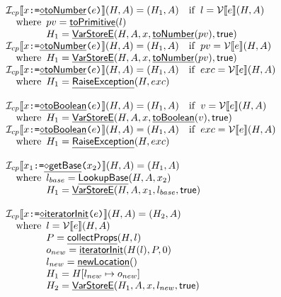 \[
\begin{array}{ll}

\I _{cp}\lbr x \TT{:=} \chfi{toNumber}\TT{(}e\TT{)} \rbr(H,A)
= (H_1, A)\quad\ifc{l = \V\lbr e\rbr(H,A)}
\\\quad\wherec{
  pv=\chf{toPrimitive}(l)\\
  H_1=\chf{VarStoreE}(H,A,x,\chf{toNumber}(pv),\vtrue)
}\\
\I _{cp}\lbr x \TT{:=} \chfi{toNumber}\TT{(}e\TT{)} \rbr(H,A)
= (H_1, A)\quad\ifc{pv = \V\lbr e\rbr(H,A)}
\\\quad\wherec{
  H_1=\chf{VarStoreE}(H,A,x,\chf{toNumber}(pv),\vtrue)
}\\
\I _{cp}\lbr x \TT{:=} \chfi{toNumber}\TT{(}e\TT{)} \rbr(H,A)
 = (H_1, A)\quad\ifc{exc = \V\lbr e\rbr(H,A)} \\
\quad\wherec{
  H_1=\chf{RaiseException}(H,exc)
}
\\\\

\I _{cp}\lbr x \TT{:=} \chfi{toBoolean}\TT{(}e\TT{)} \rbr(H,A)
= (H_1, A)\quad\ifc{v = \V\lbr e\rbr(H,A)}
\\\quad\wherec{
  H_1=\chf{VarStoreE}(H,A,x,\chf{toBoolean}(v),\vtrue)
}\\
\I _{cp}\lbr x \TT{:=} \chfi{toBoolean}\TT{(}e\TT{)} \rbr(H,A)
 = (H_1, A)\quad\ifc{exc = \V\lbr e\rbr(H,A)} \\
\quad\wherec{
  H_1=\chf{RaiseException}(H,exc)
}
\\\\

\I _{cp}\lbr x_1 \TT{:=} \chfi{getBase}\TT{(}x_2\TT{)} \rbr(H,A)
 = (H_1,A) \\
\quad\wherec{
  l_{base}=\chf{LookupBase}(H,A,x_2)\\
  H_1=\chf{VarStoreE}(H,A,x_1,l_{base},\vtrue)
}
\\\\

\I _{cp}\lbr x \TT{:=} \chfi{iteratorInit}\TT{(}e\TT{)} \rbr(H,A)
 = (H_2,A) \\
  \quad\wherec{
  l = \V\lbr e\rbr(H,A) \\
  P = \chf{collectProps}(H,l) \\
  o_{new} = \chf{iteratorInit}(H(l), P, 0) \\
  l_{new} = \chf{newLocation}() \\
  H_1 = H[l_{new}\mapsto o_{new}] \\
  H_2 = \chf{VarStoreE}(H_1,A,x,l_{new},\vtrue)
  }
\\\\


\end{array}\]
